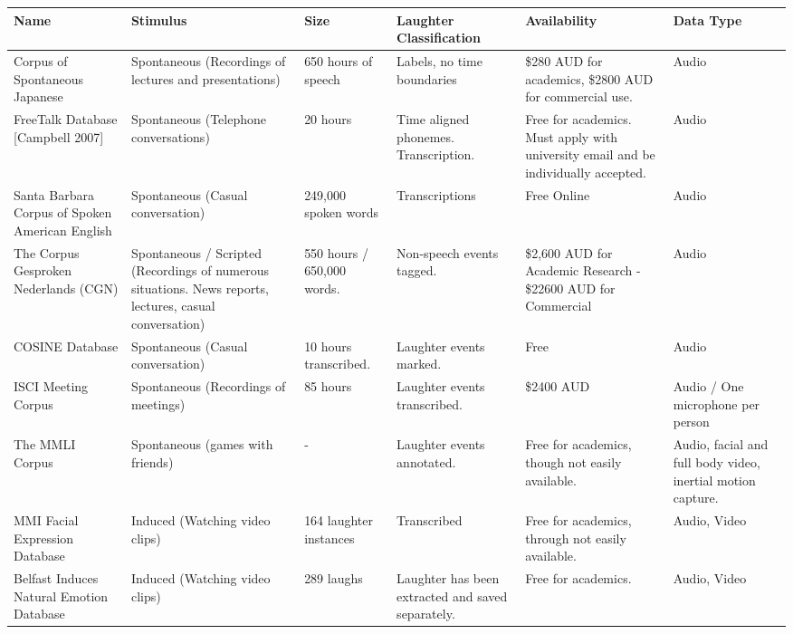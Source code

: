 \documentclass[a4paper,11pt,notitlepage]{article}
\begin{document}
\begin{landscape}
\renewcommand\arraystretch{1.5}
\begin{longtable}{|p{3cm}|p{4cm}|p{2cm}|p{3cm}|p{3.5cm}|p{3cm}|}
\hline
\textbf{Name} & \textbf{Stimulus} & \textbf{Size} & \textbf{Laughter Classification} & \textbf{Availability} & \textbf{Data Type} \\ \hline \hline
Corpus of Spontaneous Japanese & Spontaneous (Recordings of lectures and presentations) & 650 hours of speech & Labels, no time boundaries & \$280 AUD for academics, \$2800 AUD for commercial use. & Audio \\ \hline

FreeTalk Database {[}Campbell 2007{]} & Spontaneous (Telephone conversations) & 20 hours & Time aligned phonemes. Transcription. & Free for academics. Must apply with university email and be individually accepted. & Audio \\ \hline

Santa Barbara Corpus of Spoken American English & Spontaneous (Casual conversation) & 249,000 spoken words & Transcriptions & Free Online & Audio \\ \hline

The Corpus Gesproken Nederlands (CGN) & Spontaneous / Scripted (Recordings of numerous situations. News reports, lectures, casual conversation) & 550 hours / 650,000 words. & Non-speech events tagged. & \$2,600 AUD for Academic Research - \$22600 AUD for Commercial & Audio \\ \hline

COSINE Database & Spontaneous (Casual conversation) & 10 hours transcribed. & Laughter events marked. & Free & Audio \\ \hline
ISCI Meeting Corpus & Spontaneous (Recordings of meetings) & 85 hours & Laughter events transcribed. & \$2400 AUD & Audio / One microphone per person \\ \hline

The MMLI Corpus & Spontaneous (games with friends) & - & Laughter events annotated. & Free for academics, though not easily available. & Audio, facial and full body video, inertial motion capture. \\ \hline

MMI Facial Expression Database & Induced (Watching video clips) & 164 laughter instances & Transcribed & Free for academics, through not easily available. & Audio, Video \\ \hline

Belfast Induces Natural Emotion Database & Induced (Watching video clips) & 289 laughs & Laughter has been extracted and saved separately. & Free for academics. & Audio, Video \\ \hline


\end{longtable}
\end{landscape}
\end{document}
